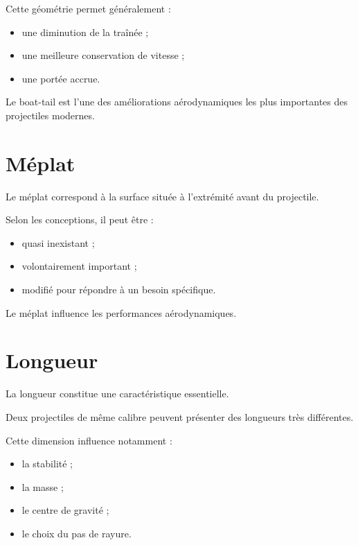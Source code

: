 Cette géométrie permet généralement :

\begin{itemize}
    \item une diminution de la traînée ;
    \item une meilleure conservation de vitesse ;
    \item une portée accrue.
\end{itemize}

\begin{aretenir}

Le boat-tail est l'une des améliorations aérodynamiques les plus importantes
des projectiles modernes.

\end{aretenir}

\section{Méplat}

Le méplat correspond à la surface située à l'extrémité avant du projectile.

Selon les conceptions, il peut être :

\begin{itemize}
    \item quasi inexistant ;
    \item volontairement important ;
    \item modifié pour répondre à un besoin spécifique.
\end{itemize}

Le méplat influence les performances aérodynamiques.

\section{Longueur}

La longueur constitue une caractéristique essentielle.

Deux projectiles de même calibre peuvent présenter des longueurs très
différentes.

Cette dimension influence notamment :

\begin{itemize}
    \item la stabilité ;
    \item la masse ;
    \item le centre de gravité ;
    \item le choix du pas de rayure.
\end{itemize}


